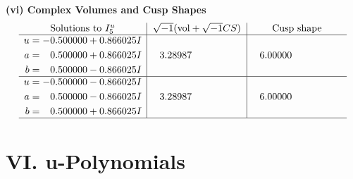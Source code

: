 \documentclass[1p]{elsarticle_modified}
\theoremstyle{definition}
\newcommand{\I}{\sqrt{-1}}
\begin{document}
\newpage\flushleft \textbf{(vi) Complex Volumes and Cusp Shapes}
$$\begin{array}{c|c|c}  
\text{Solutions to }I^u_{5}& \I (\text{vol} + \sqrt{-1}CS) & \text{Cusp shape}\\
 \hline 
\begin{aligned}
u &= -0.500000 + 0.866025 I \\
a &= \phantom{-}0.500000 + 0.866025 I \\
b &= \phantom{-}0.500000 - 0.866025 I\end{aligned}
 & \phantom{-}3.28987\phantom{ +0.000000I} & \phantom{-}6.00000\phantom{ +0.000000I} \\ \hline\begin{aligned}
u &= -0.500000 - 0.866025 I \\
a &= \phantom{-}0.500000 - 0.866025 I \\
b &= \phantom{-}0.500000 + 0.866025 I\end{aligned}
 & \phantom{-}3.28987\phantom{ +0.000000I} & \phantom{-}6.00000\phantom{ +0.000000I}\\
 \hline 
 \end{array}$$\newpage
\newpage\renewcommand{\arraystretch}{1}
\centering \section*{ VI. u-Polynomials}
\end{document}
